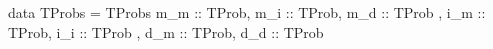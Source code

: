 data TProbs = TProbs
  { m_m :: TProb, m_i :: TProb, m_d :: TProb
  , i_m :: TProb, i_i :: TProb
  , d_m :: TProb, d_d :: TProb
  }
